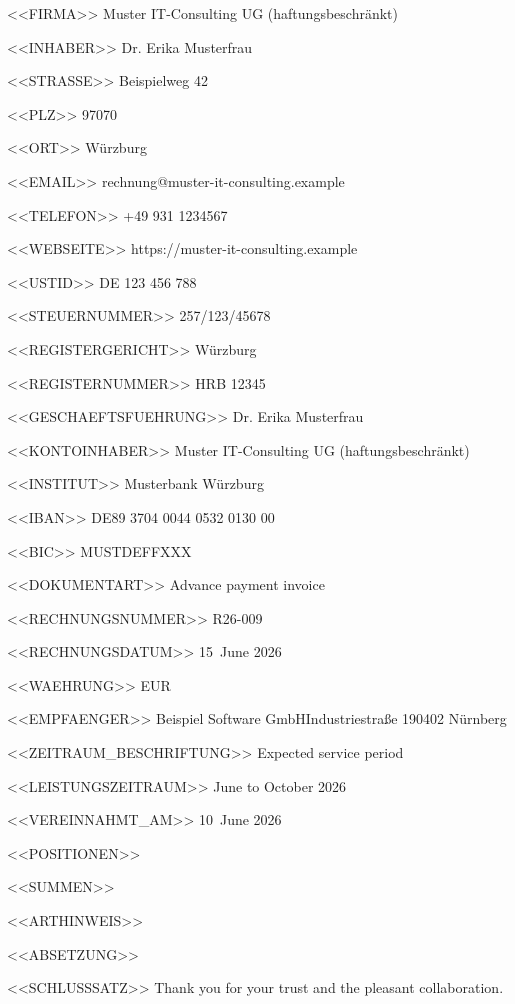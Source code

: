 <<FIRMA>>
Muster IT-Consulting UG (haftungsbeschränkt)

<<INHABER>>
Dr. Erika Musterfrau

<<STRASSE>>
Beispielweg 42

<<PLZ>>
97070

<<ORT>>
Würzburg

<<EMAIL>>
rechnung@muster-it-consulting.example

<<TELEFON>>
+49 931 1234567

<<WEBSEITE>>
https://muster-it-consulting.example

<<USTID>>
DE 123 456 788

<<STEUERNUMMER>>
257/123/45678

<<REGISTERGERICHT>>
Würzburg

<<REGISTERNUMMER>>
HRB 12345

<<GESCHAEFTSFUEHRUNG>>
Dr. Erika Musterfrau

<<KONTOINHABER>>
Muster IT-Consulting UG (haftungsbeschränkt)

<<INSTITUT>>
Musterbank Würzburg

<<IBAN>>
DE89 3704 0044 0532 0130 00

<<BIC>>
MUSTDEFFXXX

<<DOKUMENTART>>
Advance payment invoice

<<RECHNUNGSNUMMER>>
R26-009

<<RECHNUNGSDATUM>>
15~June 2026

<<WAEHRUNG>>
EUR

<<EMPFAENGER>>
Beispiel Software GmbH\zeilenwechsel{}Industriestraße 1\zeilenwechsel{}90402 Nürnberg

<<ZEITRAUM_BESCHRIFTUNG>>
Expected service period

<<LEISTUNGSZEITRAUM>>
June to October 2026

<<VEREINNAHMT_AM>>
10~June 2026

<<POSITIONEN>>

<<SUMMEN>>
   \summentrenner{}

<<ARTHINWEIS>>

<<ABSETZUNG>>

<<SCHLUSSSATZ>>
Thank you for your trust and the pleasant collaboration.
